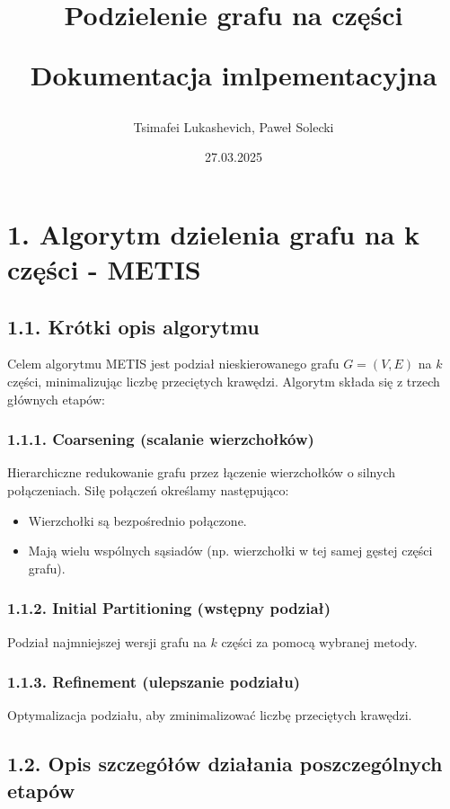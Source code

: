 \documentclass[]{article}
\title{Podzielenie grafu na części
 
Dokumentacja imlpementacyjna}
\author{Tsimafei Lukashevich, Paweł Solecki}
\date{27.03.2025}
\begin{document}
\maketitle


\section{1. Algorytm dzielenia grafu na k części - METIS}
\subsection{1.1. Krótki opis algorytmu}
Celem algorytmu METIS jest podział nieskierowanego grafu $G = (V, E)$ na $k$ części, minimalizując liczbę przeciętych krawędzi. Algorytm składa się z trzech głównych etapów: 

    \subsubsection{1.1.1. Coarsening (scalanie wierzchołków)} Hierarchiczne redukowanie grafu przez łączenie wierzchołków o silnych połączeniach. Siłę połączeń określamy następująco:
    \begin{itemize}
        \item Wierzchołki są bezpośrednio połączone.
        \item Mają wielu wspólnych sąsiadów (np. wierzchołki w tej samej gęstej części grafu).
    \end{itemize}
    \subsubsection{1.1.2. Initial Partitioning (wstępny podział)}
    Podział najmniejszej wersji grafu na $k$ części za pomocą wybranej metody.
    \subsubsection{1.1.3. Refinement (ulepszanie podziału)}
    Optymalizacja podziału, aby zminimalizować liczbę przeciętych krawędzi.

\subsection{1.2. Opis szczegółów działania poszczególnych etapów}
\end{document}
